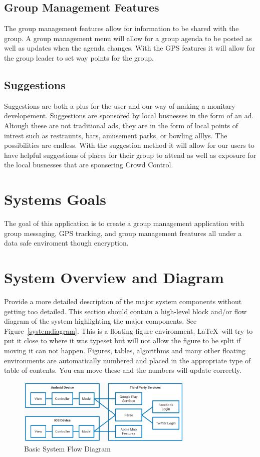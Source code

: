 \subsection{Group Management Features}
The group management features allow for information to be shared with the group. A group management menu will allow for a group agenda to be posted as well as updates when the agenda changes. With the GPS features it will allow for the group leader to set way points for the group.  

\subsection{Suggestions}
Suggestions are both a plus for the user and our way of making a monitary developement. Suggestions are sponsored by local busnesses in the form of an ad. Altough these are not traditional ads, they are in the form of local points of intrest such as restraunts, bars, amusement parks, or bowling alllys. The possibilities are endless. With the suggestion method it will allow for our users to have helpful suggestions of places for their group to attend as well as exposure for the local busnesses that are sponsering Crowd Control.

\section{Systems Goals}
The goal of this application is to create a group management application with group messaging, GPS tracking, and group management freatures all under a data safe enviroment though encryption.

\section{System Overview and Diagram}
Provide a more detailed description of the major system components
without getting too detailed.  This section should contain a
high-level block and/or flow diagram of the system highlighting the
major components.  See Figure~\ref{systemdiagram}.  This is a floating
figure environment.  \LaTeX\ will try to put it close to where it was
typeset but will not allow the figure to be split if moving it can not
happen.  Figures, tables, algorithms and many other floating
environments are automatically numbered and placed in the appropriate
type of table of contents.  You can move these and the numbers will
update correctly.

\begin{figure}[tbh]
\begin{center}
\includegraphics[width=0.75\textwidth]{designpictures/ModuleFlowDiagram.png}
\end{center}
\caption{Basic System Flow Diagram \label{ModuleFlowDiagram}}
\end{figure}

